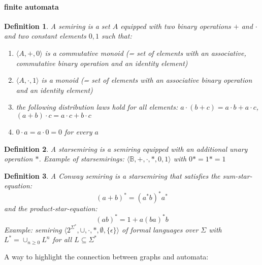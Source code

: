 \documentclass[]{article}
\newtheorem{definition}{Definition}
\begin{document}

\paragraph{finite automata} 
\begin{definition}
    A semiring is a set $A$ equipped with two binary operations $+$ and $\cdot$ and two constant elements $0,1$ such that:
    \begin{enumerate}
        \item $\langle A, +, 0\rangle$ is a commutative monoid (= set of elements with an associative, commutative binary operation and an identity element)
        \item $\langle A, \cdot, 1\rangle$ is a monoid (= set of elements with an associative binary operation and an identity element)
        \item the following distribution laws hold for all elements: $a \cdot (b+c) = a \cdot b + a \cdot c$, $(a + b)\cdot c = a\cdot c + b\cdot c$
        \item $0\cdot a = a\cdot 0 = 0$ for every $a$
    \end{enumerate}
\end{definition}

\begin{definition}
    A starsemiring is a semiring equipped with an additional unary operation $*$. Example of starsemirings: $\langle \mathbb{B}, +, \cdot, *, 0, 1 \rangle$ with $0*=1*=1$
\end{definition}

\begin{definition}
    A Conway semiring is a starsemiring that satisfies the sum-star-equation:
    \begin{equation}
        (a+b)^* = (a^*b)^*a^*
    \end{equation}
     and the product-star-equation:
    \begin{equation}
        (ab)^* = 1 + a(ba)^*b
    \end{equation}
     Example: semiring $\langle 2^{\Sigma^*}, \cup, \cdot, *, \emptyset, \{ \epsilon \} \rangle$ of formal languages over $\Sigma$ with $L^*=\cup_{n\geq 0}L^n$ for all $L \subseteq \Sigma^*$
\end{definition}

A way to highlight the connection between graphs and automata:
\end{document}

